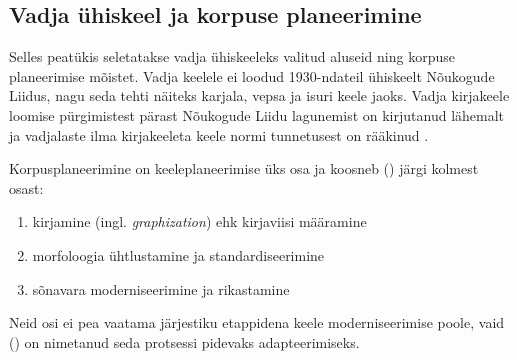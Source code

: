 \documentclass[12pt,a4paper]{article}
\begin{document}



\subsection{Vadja ühiskeel ja korpuse planeerimine}


Selles peatükis seletatakse vadja ühiskeeleks valitud aluseid ning korpuse planeerimise mõistet. Vadja keelele ei loodud 1930-ndateil ühiskeelt Nõukogude Liidus, nagu seda tehti näiteks karjala, vepsa ja isuri keele jaoks. Vadja kirjakeele loomise pürgimistest pärast Nõukogude Liidu lagunemist on kirjutanud lähemalt \cite{ernits_vadja_2006} ja vadjalaste ilma kirjakeeleta keele normi tunnetusest on rääkinud \cite{markus_concept_2013}.

Korpusplaneerimine on keele\-planeerimise üks osa ja koosneb (\cite{kloss_research_1970}) järgi kolmest osast:
\begin{enumerate}
\item kirjamine (ingl. \textit{graphization}) ehk kirjaviisi määramine
\item morfoloogia ühtlustamine ja standardiseerimine
\item sõnavara moderniseerimine ja rikastamine
\end{enumerate}

Neid osi ei pea vaatama järjestiku etappidena keele moderniseerimise poole, vaid (\cite{coulmas_language_1989}) on nimetanud seda protsessi pidevaks adapteerimiseks.
\end{document}
